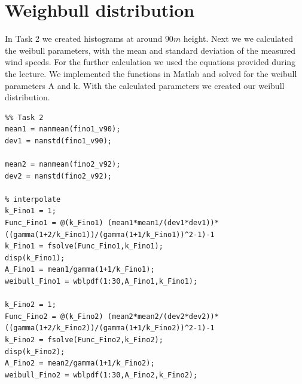 \documentclass[10pt]{article}
\begin{document}
\newpage
\section{Weighbull distribution}
In Task 2 we created histograms at around $90m$ height. Next we we calculated the weibull parameters, with the mean and standard deviation of the measured wind speeds. For the further calculation we used the equations provided during the lecture. We implemented the functions in Matlab and solved for the weibull parameters A and k. With the calculated parameters we created our weibull distribution.


\begin{lstlisting}
%% Task 2
mean1 = nanmean(fino1_v90);
dev1 = nanstd(fino1_v90);

mean2 = nanmean(fino2_v92);
dev2 = nanstd(fino2_v92);

% interpolate
k_Fino1 = 1;
Func_Fino1 = @(k_Fino1) (mean1*mean1/(dev1*dev1))*((gamma(1+2/k_Fino1))/(gamma(1+1/k_Fino1))^2-1)-1 
k_Fino1 = fsolve(Func_Fino1,k_Fino1);
disp(k_Fino1);
A_Fino1 = mean1/gamma(1+1/k_Fino1);
weibull_Fino1 = wblpdf(1:30,A_Fino1,k_Fino1);

k_Fino2 = 1;
Func_Fino2 = @(k_Fino2) (mean2*mean2/(dev2*dev2))*((gamma(1+2/k_Fino2))/(gamma(1+1/k_Fino2))^2-1)-1 
k_Fino2 = fsolve(Func_Fino2,k_Fino2);
disp(k_Fino2);
A_Fino2 = mean2/gamma(1+1/k_Fino2);
weibull_Fino2 = wblpdf(1:30,A_Fino2,k_Fino2);
\end{lstlisting}
\end{document}
